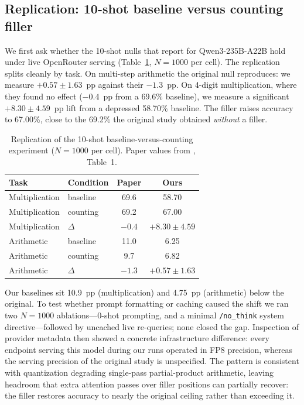 \documentclass[11pt,a4paper]{article}
\begin{document}
\subsection{Replication: 10-shot baseline versus counting filler}
\label{sec:replication}

We first ask whether the 10-shot nulls that \citet{baherwani2026not} report for
Qwen3-235B-A22B hold under live OpenRouter serving (Table~\ref{tab:replication},
$N{=}1000$ per cell). The replication splits cleanly by task. On multi-step
arithmetic the original null reproduces: we measure $+0.57 \pm 1.63$~pp against
their $-1.3$~pp. On 4-digit multiplication, where they found no effect
($-0.4$~pp from a 69.6\% baseline), we measure a significant
$+8.30 \pm 4.59$~pp lift from a depressed 58.70\% baseline. The filler raises
accuracy to 67.00\%, close to the 69.2\% the original study obtained \emph{without}
a filler.

\begin{table}[h]
\centering
\caption{Replication of the 10-shot baseline-versus-counting experiment
($N{=}1000$ per cell). Paper values from \citet{baherwani2026not}, Table~1.}
\label{tab:replication}
\begin{tabular}{llcc}
\toprule
\textbf{Task} & \textbf{Condition} & \textbf{Paper} & \textbf{Ours} \\
\midrule
Multiplication & baseline & 69.6 & 58.70 \\
Multiplication & counting & 69.2 & 67.00 \\
Multiplication & $\Delta$ & $-0.4$ & $\mathbf{+8.30 \pm 4.59}$ \\
\midrule
Arithmetic & baseline & 11.0 & 6.25 \\
Arithmetic & counting & 9.7 & 6.82 \\
Arithmetic & $\Delta$ & $-1.3$ & $+0.57 \pm 1.63$ \\
\bottomrule
\end{tabular}
\end{table}

Our baselines sit 10.9~pp (multiplication) and 4.75~pp (arithmetic) below the
original. To test whether prompt formatting or caching caused the shift we ran
two $N{=}1000$ ablations---0-shot prompting, and a minimal \texttt{/no\_think}
system directive---followed by uncached live re-queries; none closed the gap.
Inspection of provider metadata then showed a concrete infrastructure difference:
every endpoint serving this model during our runs operated in FP8 precision,
whereas the serving precision of the original study is unspecified. The pattern
is consistent with quantization degrading single-pass partial-product arithmetic,
leaving headroom that extra attention passes over filler positions can partially
recover: the filler restores accuracy to nearly the original ceiling rather than
exceeding it.
\end{document}
